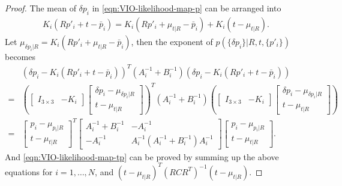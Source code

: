 \begin{proof}
	The mean of $\delta p_i$ in \eqref{eqn:VIO-likelihood-map-p} can be arranged into
	\begin{align*}
		K_i(Rp'_i+t-\bar{p}_i) = K_i(Rp'_i+\mu_{t|R}-\bar{p}_i) + K_i(t-\mu_{t|R}).
	\end{align*}
	Let $\mu_{\delta p_i|R} = K_i(Rp'_i+\mu_{t|R}-\bar{p}_i)$, then the exponent of $p(\{\delta p_i\}|R,t,\{p'_i\})$ becomes
	\begin{align*}
		&\left( \delta p_i - K_i(Rp'_i+t-\bar{p}_i) \right)^T (A_i^{-1}+B_i^{-1}) \left( \delta p_i - K_i(Rp'_i+t-\bar{p}_i) \right) \\
		= &\left( \begin{bmatrix} I_{3\times 3} & -K_i \end{bmatrix} \begin{bmatrix} \delta p_i - \mu_{\delta p_i|R} \\ t-\mu_{t|R} \end{bmatrix} \right)^T (A_i^{-1} + B_i^{-1}) \left( \begin{bmatrix} I_{3\times 3} & -K_i \end{bmatrix} \begin{bmatrix} \delta p_i - \mu_{\delta p_i|R} \\ t-\mu_{t|R} \end{bmatrix} \right) \\
		= &\begin{bmatrix} p_i - \mu_{p_i|R} \\ t-\mu_{t|R} \end{bmatrix}^T \begin{bmatrix} A_i^{-1} + B_i^{-1} & -A_i^{-1} \\ -A_i^{-1} & A_i^{-1}(A_i^{-1} + B_i^{-1})A_i^{-1} \end{bmatrix} \begin{bmatrix} p_i - \mu_{p_i|R} \\ t-\mu_{t|R} \end{bmatrix}.
	\end{align*}
	And \eqref{eqn:VIO-likelihood-map-tp} can be proved by summing up the above equations for $i=1,\ldots,N$, and $(t-\mu_{t|R})^T(RCR^T)^{-1}(t-\mu_{t|R})$.
\end{proof}

